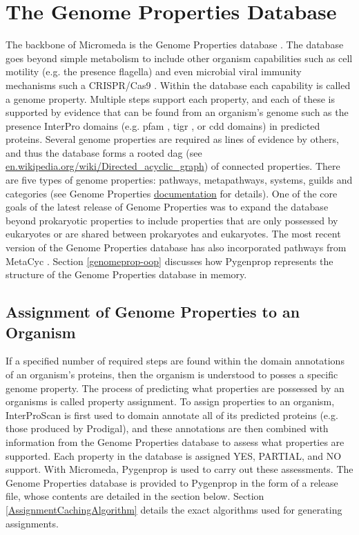 \section{The Genome Properties Database} \label{genome-properties-overview}

The backbone of Micromeda is the Genome Properties database \cite{Haft2013}. The database goes beyond simple metabolism to include other organism capabilities such as cell motility (e.g. the presence flagella) and even microbial viral immunity mechanisms such a CRISPR/Cas9 \cite{horvath2010crispr}. Within the database each capability is called a genome property. Multiple steps support each property, and each of these is supported by evidence that can be found from an organism's genome such as the presence InterPro domains (e.g. \gls{pfam} \cite{bateman2004pfam}, \gls{tigr} \cite{haft2001tigrfams}, or \gls{cdd} \cite{marchler2014cdd} domains) in predicted proteins. Several genome properties are required as lines of evidence by others, and thus the database forms a rooted \gls{dag} (see \href{en.wikipedia.org/wiki/Directed\_acyclic\_graph}{en.wikipedia.org/wiki/Directed\_acyclic\_graph}) of connected properties. There are five types of genome properties: pathways, metapathways, systems, guilds and categories (see Genome Properties \href{genome-properties.readthedocs.io/en/latest/flatfile.html\#desc-file}{documentation} for details). One of the core goals of the latest release of Genome Properties was to expand the database beyond prokaryotic properties to include properties that are only possessed by eukaryotes or are shared between prokaryotes and eukaryotes. The most recent version of the Genome Properties database has also incorporated pathways from MetaCyc \cite{karp2002metacyc}. Section \ref{genomeprop-oop} discusses how Pygenprop represents the structure of the Genome Properties database in memory.

\subsection{Assignment of Genome Properties to an Organism}

If a specified number of required steps are found within the domain annotations of an organism's proteins, then the organism is understood to posses a specific genome property. The process of predicting what properties are possessed by an organisms is called property assignment. To assign properties to an organism, InterProScan is first used to domain annotate all of its predicted proteins (e.g. those produced by Prodigal), and these annotations are then combined with information from the Genome Properties database to assess what properties are supported. Each property in the database is assigned YES, PARTIAL, and NO support. With Micromeda, Pygenprop is used to carry out these assessments. The Genome Properties database is provided to Pygenprop in the form of a release file, whose contents are detailed in the section below. Section \ref{AssignmentCachingAlgorithm} details the exact algorithms used for generating assignments.  

